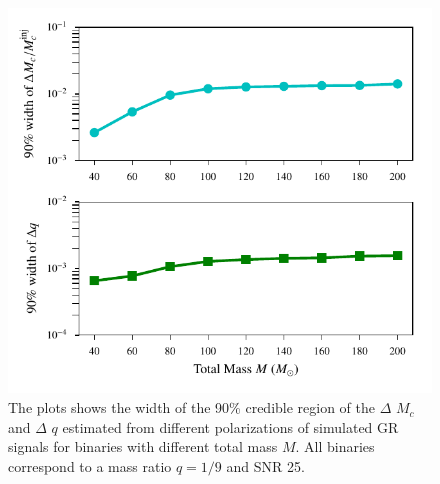 \documentclass[prd,preprintnumbers,twocolumn,eqsecnum,floatfix,a4paper,nofootinbib,superscriptaddress]{revtex4}
\begin{document}
\begin{figure}[h]
    \begin{center}
    \includegraphics[scale=0.75]{figs/hp_hc_consistency_confidence_interval_varying_M.pdf} 
    \end{center} 
    \caption{The plots shows the width of the 90\% credible region of the $\Delta$ $M_{c}$ and $\Delta$ $q$ estimated from different polarizations of simulated GR signals for binaries with different total mass $M$. All binaries correspond to a mass ratio $q = 1/9$ and SNR 25.}
    \label{fig:hphc_bound_a}
\end{figure}

\newpage
\end{document}
